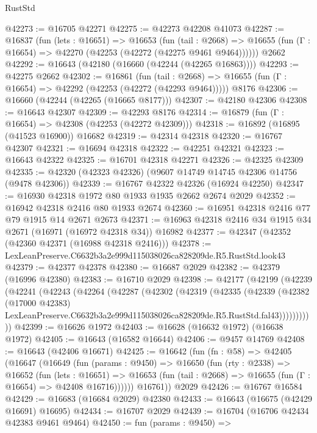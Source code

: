 \begin{lexlean}{RustStd}
\begin{coremodule}
@42273 := @16705 @42271
@42275 := @42273 @42208 @41073
@42287 := @16837
    (fun (lets : @16651) =>
    @16653
      (fun (tail : @2668) =>
      @16655 (fun (Γ : @16654) => @42270 (@42253 (@42272 (@42275 @9461 @9464))))))
    @2662
@42292 := @16643 (@42180 (@16660 (@42244 (@42265 @16863))))
@42293 := @42275 @2662
@42302 := @16861
    (fun (tail : @2668) => @16655 (fun (Γ : @16654) => @42292 (@42253 (@42272 (@42293 @9464)))))
    @8176
@42306 := @16660 (@42244 (@42265 (@16665 @8177)))
@42307 := @42180 @42306
@42308 := @16643 @42307
@42309 := @42293 @8176
@42314 := @16879 (fun (Γ : @16654) => @42308 (@42253 (@42272 @42309)))
@42318 := @16892 (@16895 (@41523 @16900)) @16682
@42319 := @42314 @42318
@42320 := @16767 @42307
@42321 := @16694 @42318
@42322 := @42251 @42321
@42323 := @16643 @42322
@42325 := @16701 @42318 @42271
@42326 := @42325 @42309
@42335 := @42320 (@42323 @42326) (@9607 @14749 @14745 @42306 @14756 (@9478 @42306))
@42339 := @16767 @42322 @42326 (@16924 @42250)
@42347 := @16930 @42318 @1972 @80 @1933 @1935 @2662 @2674 @2029
@42352 := @16942 @42318 @2416 @80 @1933 @2674
@42360 := @16951 @42318 @2416 @77 @79 @1915 @14 @2671 @2673
@42371 := @16963 @42318 @2416 @34 @1915 @34 @2671 (@16971 (@16972 @42318 @34)) @16982
@42377 := @42347 (@42352 (@42360 @42371 (@16988 @42318 @2416)))
@42378 := LexLeanPreserve.C6632b3a2e999d115038026ca828209de.R5.RustStd.look43
@42379 := @42377 @42378
@42380 := @16687 @2029
@42382 := @42379 (@16996 @42380)
@42383 := @16710 @2029
@42398 := @42177
    (@42199
      (@42239
        (@42241
          (@42243
            (@42264
              (@42287
                (@42302
                  (@42319
                    (@42335
                      (@42339
                        (@42382
                          (@17000 @42383)
                          LexLeanPreserve.C6632b3a2e999d115038026ca828209de.R5.RustStd.fal43)))))))))))
@42399 := @16626 @1972
@42403 := @16628 (@16632 @1972) (@16638 @1972)
@42405 := @16643 (@16582 @16644)
@42406 := @9457 @14769
@42408 := @16643 (@42406 @16671)
@42425 := @16642
    (fun (fn : @58) =>
    @42405
      (@16647
        (@16649
          (fun (params : @9450) =>
          @16650
            (fun (rty : @2338) =>
            @16652
              (fun (lets : @16651) =>
              @16653 (fun (tail : @2668) => @16655 (fun (Γ : @16654) => @42408 @16716))))))
        @16761))
    @2029
@42426 := @16767 @16584
@42429 := @16683 (@16684 @2029) @42380
@42433 := @16643 (@16675 (@42429 @16691) @16695)
@42434 := @16707 @2029
@42439 := @16704 (@16706 @42434 @42383 @9461 @9464)
@42450 := fun (params : @9450) =>

\end{coremodule}
\end{lexlean}
